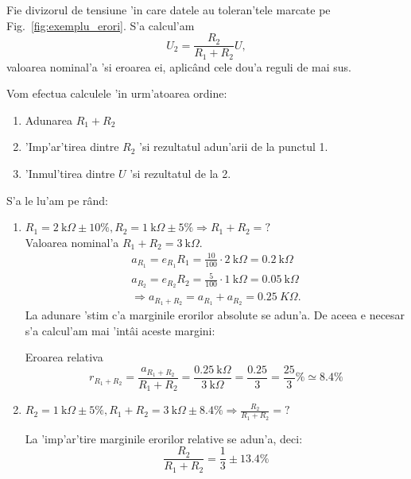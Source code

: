 \begin{example}[]
  Fie divizorul de tensiune 'in care datele au toleran'tele marcate pe Fig.~\ref{fig:exemplu_erori}.
%
S'a calcul'am
\begin{equation} \label{eq:exemplu_erori}
U_2 = \frac{R_2}{R_1+R_2}U,
\end{equation}
valoarea nominal'a 'si eroarea ei, aplic\^and cele dou'a reguli de mai sus.

Vom efectua calculele 'in urm'atoarea ordine:
\begin{enumerate}
\item Adunarea $R_1+R_2$
\item 'Imp'ar'tirea dintre $R_2$ 'si rezultatul adun'arii de la punctul 1.
\item 'Inmul'tirea dintre $U$ 'si rezultatul de la 2.
\end{enumerate}

S'a le lu'am pe r\^and:
\begin{enumerate}
\item \textcolor{Bittersweet}{$R_1 = 2~\mathrm{k}\Omega\pm10\%, R_2 = 1~\mathrm{k}\Omega\pm5\% \Longrightarrow R_1+R_2=?$}\\
Valoarea nominal'a $R_1 + R_2 = 3~\mathrm{k}\Omega$.
  \begin{align*}
    a_{R_1} = e_{R_1}R_1 = \frac{10}{100}\cdot 2~\mathrm{k}\Omega = 0.2~\mathrm{k}\Omega \\
    a_{R_2} = e_{R_2}R_2 = \frac{5}{100}\cdot 1~\mathrm{k}\Omega = 0.05~\mathrm{k}\Omega \\
    \Longrightarrow a_{R_1+R_2} = a_{R_1} + a_{R_2} = 0.25 ~K\Omega.
  \end{align*}
La adunare 'stim c'a marginile erorilor absolute se adun'a. De aceea e necesar s'a calcul'am mai 'int\^ai aceste margini:

Eroarea relativa 
\begin{equation*}
r_{R_1+R_2} = \frac{a_{R_1+R_2}}{R_1+R_2} = \frac{0.25~\mathrm{k}\Omega}{3~\mathrm{k}\Omega} = \frac{0.25}{3} = \frac{25}{3}\% \simeq 8.4\%
\end{equation*}

\item \textcolor{Bittersweet}{$R_2 = 1~\mathrm{k}\Omega\pm5\%, R_1+R_2 = 3~\mathrm{k}\Omega\pm8.4\% \Longrightarrow \frac{R_2}{R_1+R_2}=?$}

La 'imp'ar'tire marginile erorilor relative se adun'a, deci:
\begin{equation*}
\frac{R_2}{R_1+R_2} = \frac{1}{3} \pm 13.4\%
\end{equation*}



\end{enumerate}
\end{example}
